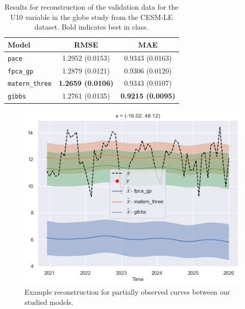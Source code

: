 \begin{table}
	\caption[Results for U10 variable on validation data in the Globe study]{Results for reconstruction of the validation data for the U10 variable in the globe study from the CESM-LE dataset. Bold indicates best in class.}
	\centering
	\label{tab:train_cesm_u10_globe}
	\begin{tabular}{lcc}
		\toprule
		\textbf{Model} & \textbf{RMSE} & \textbf{MAE} \\
		\midrule
		\verb*|pace| & 1.2952 (0.0153) & 0.9343	(0.0163) \\
		\verb*|fpca_gp| & 1.2879 (0.0121) & 0.9306 (0.0120) \\
		\verb*|matern_three| & \textbf{1.2659 (0.0106)}& 0.9343	(0.0107)\\
		\verb*|gibbs| & 1.2761	(0.0135) & \textbf{0.9215	(0.0095)}\\
		\bottomrule
	\end{tabular}
\end{table}

\begin{figure}
\centering
\includegraphics[width=\textwidth]{test_ex_u10_globe}
\caption{Example reconstruction for partially observed curves between our studied models.}
\label{fig:train_ex_u10_globe}
\end{figure}

